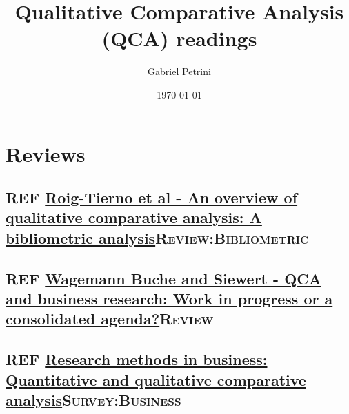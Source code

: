 \documentclass[11pt]{article}
\author{Gabriel Petrini}
\date{\today}
\title{Qualitative Comparative Analysis (QCA) readings}
\begin{document}
\maketitle
\tableofcontents


\section*{Reviews}
\label{sec:orga82d0c0}
\subsection*{{\bfseries\sffamily REF} \href{https://doi.org/10.1016/j.jik.2016.12.002}{Roig-Tierno et al - An overview of qualitative comparative analysis: A bibliometric analysis}\hfill{}\textsc{Review:Bibliometric}}
\label{sec:org3ebe0ea}
\subsection*{{\bfseries\sffamily REF} \href{https://doi.org/10.1016/j.jbusres.2015.10.010}{Wagemann Buche and Siewert - QCA and business research: Work in progress or a consolidated agenda?}\hfill{}\textsc{Review}}
\label{sec:orga093e1f}

\subsection*{{\bfseries\sffamily REF} \href{https://doi.org/10.1016/j.jbusres.2020.05.003}{Research methods in business: Quantitative and qualitative comparative analysis}\hfill{}\textsc{Survey:Business}}
\label{sec:org8c1b985}
\end{document}
